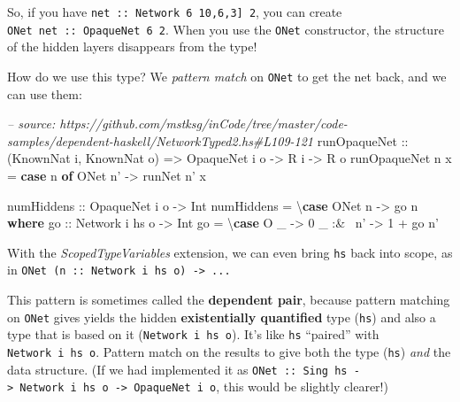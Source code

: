 \documentclass[]{article}
\newenvironment{Shaded}{}{}
\newcommand{\KeywordTok}[1]{\textcolor[rgb]{0.00,0.44,0.13}{\textbf{{#1}}}}
\newcommand{\DataTypeTok}[1]{\textcolor[rgb]{0.56,0.13,0.00}{{#1}}}
\newcommand{\DecValTok}[1]{\textcolor[rgb]{0.25,0.63,0.44}{{#1}}}
\newcommand{\CommentTok}[1]{\textcolor[rgb]{0.38,0.63,0.69}{\textit{{#1}}}}
\newcommand{\OtherTok}[1]{\textcolor[rgb]{0.00,0.44,0.13}{{#1}}}
\newcommand{\FunctionTok}[1]{\textcolor[rgb]{0.02,0.16,0.49}{{#1}}}
\newcommand{\NormalTok}[1]{{#1}}
\begin{document}
So, if you have \texttt{net\ ::\ Network\ 6\ \textquotesingle{}{[}10,6,3{]}\ 2},
you can create \texttt{ONet\ net\ ::\ OpaqueNet\ 6\ 2}. When you use the
\texttt{ONet} constructor, the structure of the hidden layers disappears from
the type!

How do we use this type? We \emph{pattern match} on \texttt{ONet} to get the net
back, and we can use them:

\begin{Shaded}
\begin{Highlighting}[]
\CommentTok{-- source: https://github.com/mstksg/inCode/tree/master/code-samples/dependent-haskell/NetworkTyped2.hs#L109-121}
\OtherTok{runOpaqueNet ::} \NormalTok{(}\DataTypeTok{KnownNat} \NormalTok{i, }\DataTypeTok{KnownNat} \NormalTok{o)}
             \OtherTok{=>} \DataTypeTok{OpaqueNet} \NormalTok{i o}
             \OtherTok{->} \DataTypeTok{R} \NormalTok{i}
             \OtherTok{->} \DataTypeTok{R} \NormalTok{o}
\NormalTok{runOpaqueNet n x }\FunctionTok{=} \KeywordTok{case} \NormalTok{n }\KeywordTok{of}
                     \DataTypeTok{ONet} \NormalTok{n' }\OtherTok{->} \NormalTok{runNet n' x}

\OtherTok{numHiddens ::} \DataTypeTok{OpaqueNet} \NormalTok{i o }\OtherTok{->} \DataTypeTok{Int}
\NormalTok{numHiddens }\FunctionTok{=} \NormalTok{\textbackslash{}}\KeywordTok{case} \DataTypeTok{ONet} \NormalTok{n }\OtherTok{->} \NormalTok{go n}
  \KeywordTok{where}
\OtherTok{    go ::} \DataTypeTok{Network} \NormalTok{i hs o }\OtherTok{->} \DataTypeTok{Int}
    \NormalTok{go }\FunctionTok{=} \NormalTok{\textbackslash{}}\KeywordTok{case} \DataTypeTok{O} \NormalTok{_      }\OtherTok{->} \DecValTok{0}
               \NormalTok{_ }\FunctionTok{:&~} \NormalTok{n' }\OtherTok{->} \DecValTok{1} \FunctionTok{+} \NormalTok{go n'}
\end{Highlighting}
\end{Shaded}

With the \emph{ScopedTypeVariables} extension, we can even bring \texttt{hs}
back into scope, as in
\texttt{ONet\ (n\ ::\ Network\ i\ hs\ o)\ -\textgreater{}\ ...}

This pattern is sometimes called the \textbf{dependent pair}, because pattern
matching on \texttt{ONet} gives yields the hidden \textbf{existentially
quantified} type (\texttt{hs}) and also a type that is based on it
(\texttt{Network\ i\ hs\ o}). It's like \texttt{hs} ``paired'' with
\texttt{Network\ i\ hs\ o}. Pattern match on the results to give both the type
(\texttt{hs}) \emph{and} the data structure. (If we had implemented it as
\texttt{ONet\ ::\ Sing\ hs\ -\textgreater{}\ Network\ i\ hs\ o\ -\textgreater{}\ OpaqueNet\ i\ o},
this would be slightly clearer!)
\end{document}
